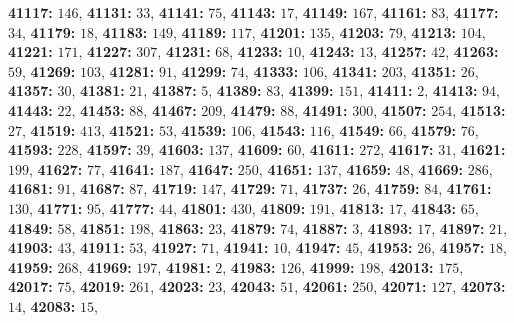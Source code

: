 \textsf{\bfseries 41117:} $146$, \textsf{\bfseries 41131:} $33$, \textsf{\bfseries 41141:} $75$, \textsf{\bfseries 41143:} $17$, \textsf{\bfseries 41149:} $167$, \textsf{\bfseries 41161:} $83$, \textsf{\bfseries 41177:} $34$, \textsf{\bfseries 41179:} $18$, \textsf{\bfseries 41183:} $149$, \textsf{\bfseries 41189:} $117$, \textsf{\bfseries 41201:} $135$, \textsf{\bfseries 41203:} $79$, \textsf{\bfseries 41213:} $104$, \textsf{\bfseries 41221:} $171$, \textsf{\bfseries 41227:} $307$, \textsf{\bfseries 41231:} $68$, \textsf{\bfseries 41233:} $10$, \textsf{\bfseries 41243:} $13$, \textsf{\bfseries 41257:} $42$, \textsf{\bfseries 41263:} $59$, \textsf{\bfseries 41269:} $103$, \textsf{\bfseries 41281:} $91$, \textsf{\bfseries 41299:} $74$, \textsf{\bfseries 41333:} $106$, \textsf{\bfseries 41341:} $203$, \textsf{\bfseries 41351:} $26$, \textsf{\bfseries 41357:} $30$, \textsf{\bfseries 41381:} $21$, \textsf{\bfseries 41387:} $5$, \textsf{\bfseries 41389:} $83$, \textsf{\bfseries 41399:} $151$, \textsf{\bfseries 41411:} $2$, \textsf{\bfseries 41413:} $94$, \textsf{\bfseries 41443:} $22$, \textsf{\bfseries 41453:} $88$, \textsf{\bfseries 41467:} $209$, \textsf{\bfseries 41479:} $88$, \textsf{\bfseries 41491:} $300$, \textsf{\bfseries 41507:} $254$, \textsf{\bfseries 41513:} $27$, \textsf{\bfseries 41519:} $413$, \textsf{\bfseries 41521:} $53$, \textsf{\bfseries 41539:} $106$, \textsf{\bfseries 41543:} $116$, \textsf{\bfseries 41549:} $66$, \textsf{\bfseries 41579:} $76$, \textsf{\bfseries 41593:} $228$, \textsf{\bfseries 41597:} $39$, \textsf{\bfseries 41603:} $137$, \textsf{\bfseries 41609:} $60$, \textsf{\bfseries 41611:} $272$, \textsf{\bfseries 41617:} $31$, \textsf{\bfseries 41621:} $199$, \textsf{\bfseries 41627:} $77$, \textsf{\bfseries 41641:} $187$, \textsf{\bfseries 41647:} $250$, \textsf{\bfseries 41651:} $137$, \textsf{\bfseries 41659:} $48$, \textsf{\bfseries 41669:} $286$, \textsf{\bfseries 41681:} $91$, \textsf{\bfseries 41687:} $87$, \textsf{\bfseries 41719:} $147$, \textsf{\bfseries 41729:} $71$, \textsf{\bfseries 41737:} $26$, \textsf{\bfseries 41759:} $84$, \textsf{\bfseries 41761:} $130$, \textsf{\bfseries 41771:} $95$, \textsf{\bfseries 41777:} $44$, \textsf{\bfseries 41801:} $430$, \textsf{\bfseries 41809:} $191$, \textsf{\bfseries 41813:} $17$, \textsf{\bfseries 41843:} $65$, \textsf{\bfseries 41849:} $58$, \textsf{\bfseries 41851:} $198$, \textsf{\bfseries 41863:} $23$, \textsf{\bfseries 41879:} $74$, \textsf{\bfseries 41887:} $3$, \textsf{\bfseries 41893:} $17$, \textsf{\bfseries 41897:} $21$, \textsf{\bfseries 41903:} $43$, \textsf{\bfseries 41911:} $53$, \textsf{\bfseries 41927:} $71$, \textsf{\bfseries 41941:} $10$, \textsf{\bfseries 41947:} $45$, \textsf{\bfseries 41953:} $26$, \textsf{\bfseries 41957:} $18$, \textsf{\bfseries 41959:} $268$, \textsf{\bfseries 41969:} $197$, \textsf{\bfseries 41981:} $2$, \textsf{\bfseries 41983:} $126$, \textsf{\bfseries 41999:} $198$, \textsf{\bfseries 42013:} $175$, \textsf{\bfseries 42017:} $75$, \textsf{\bfseries 42019:} $261$, \textsf{\bfseries 42023:} $23$, \textsf{\bfseries 42043:} $51$, \textsf{\bfseries 42061:} $250$, \textsf{\bfseries 42071:} $127$, \textsf{\bfseries 42073:} $14$, \textsf{\bfseries 42083:} $15$, 
